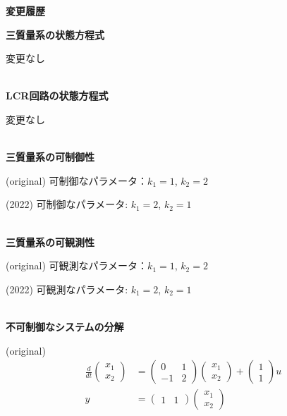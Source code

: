\documentclass[a4paper,11pt,fleqn]{jreport}
\begin{document}
\begin{center}
	{\Large \bf 変更履歴}
\end{center}
	

\noindent
{\bf 三質量系の状態方程式}

変更なし

\ \\ \noindent
{\bf LCR回路の状態方程式}

変更なし

\ \\ \noindent
{\bf 三質量系の可制御性}

(original) 可制御なパラメータ：$k_1=1$, $k_2=2$

(2022) 可制御なパラメータ:{\color{red} $k_1=2$, $k_2=1$}

\ \\ \noindent
{\bf 三質量系の可観測性}

(original) 可観測なパラメータ：$k_1=1$, $k_2=2$

(2022) 可観測なパラメータ:{\color{red} $k_1=2$, $k_2=1$}

\ \\ \noindent
{\bf 不可制御なシステムの分解}

(original)
\begin{align*}
	\frac{d}{dt}
	\left (
	\begin{array}{c}
	 x_1 \\ x_2 
	\end{array}
	\right )
	& = 
	\left (
	\begin{array}{cc}
	 0 & 1 \\
	 -1 & 2
	\end{array}
	\right )
	\left (
	\begin{array}{c}
	 x_1 \\ x_2 
	\end{array}
	\right )
	+
	\left (
	\begin{array}{c}
	 1 \\ 1 
	\end{array}
	\right )
	u
\\
	y 
	&=
	\left (
	\begin{array}{cc}
	 1 & 1  
	\end{array}
	\right )
	\left (
	\begin{array}{c}
	 x_1 \\ x_2 
	\end{array}
	\right )
\end{align*}
\end{document}
